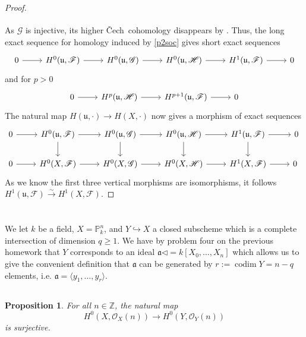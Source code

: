 \documentclass[english,letter,doublesided]{article}
\newcommand{\tosm}{\xrightarrow{\sim}}
\newcommand{\Ff}{\mathscr{F}}
\newcommand{\Hh}{\mathscr{H}}
\newcommand{\ZZ}{\mathbb{Z}}
\newcommand{\OO}{\mathcal{O}}
\newcommand{\Gg}{\mathscr{G}}
\newcommand{\PP}{\mathbb{P}}
\newcommand{\afr}{\mathfrak{a}}
\newcommand{\ufr}{\mathfrak{u}}
\newcommand{\prob}[1]{\setcounter{section}{#1-1}\section{}}
\newcommand{\prt}[1]{\setcounter{subsection}{#1-1}\subsection{}}
\newtheorem*{prop*}{Proposition}
\theoremstyle{remark}
\theoremstyle{definition}
\newcommand{\idl}[1]{\langle #1 \rangle}
\DeclareMathOperator{\codim}{codim}
\newcommand{\cech}{\v Cech~}
\begin{document}
\begin{proof}
\begin{equation}
\begin{tikzcd}
	\end{tikzcd}
	\end{equation}
As $\Gg$ is injective, its higher \cech cohomology disappears by \cite[III.2.4-5]{HSAG}. Thus, the long exact sequence for homology induced by \eqref{p2soc} gives short exact sequences \begin{equation}\begin{tikzcd}0\arrow[r]& H^0(\ufr,\Ff)\arrow[r]&H^0(\ufr,\Gg)\arrow[r]&H^0(\ufr,\Hh)\arrow[r]&H^1(\ufr,\Ff)\arrow[r]&0\end{tikzcd}\end{equation}
and for $p>0$
\begin{equation}\begin{tikzcd}0\arrow[r]&H^p(\ufr,\Hh)\arrow[r]&H^{p+1}(\ufr,\Ff)\arrow[r]&0\end{tikzcd}\end{equation}
The natural map $H(\ufr,\cdot)\to H(X,\cdot)$ now gives a morphism of exact sequences
\begin{equation}\begin{tikzcd}0\arrow[r]& H^0(\ufr,\Ff)\arrow[r]\arrow[d]&H^0(\ufr,\Gg)\arrow[r]\arrow[d]&H^0(\ufr,\Hh)\arrow[r]\arrow[d]&H^1(\ufr,\Ff)\arrow[r]\arrow[d]&0\\
0\arrow[r]& H^0(X,\Ff)\arrow[r]&H^0(X,\Gg)\arrow[r]&H^0(X,\Hh)\arrow[r]&H^1(X,\Ff)\arrow[r]&0\
\end{tikzcd}\end{equation}
As we know the first three vertical morphisms are isomorphisms, it follows $H^1(\ufr,\Ff)\tosm H^1(X,\Ff)$.
\end{proof}
\prob{6}
We let $k$ be a field, $X=\PP^n_k$, and $Y\hookrightarrow X$ a closed subscheme which is a complete intersection of dimension $q\geq 1$. We have by problem four on the previous homework that $Y$ corresponds to an ideal $\afr\triangleleft = k[X_0,\dots,X_n]$ which allows us to give the convenient definition that $\afr$ can be generated by $r:=\codim Y=n-q$ elements, i.e. $\afr=\idl{y_1,\dots,y_r}$.
\prt{1}
\begin{prop*}
	For all $n\in \ZZ$, the natural map $$H^0(X,\OO_X(n))\to H^0(Y,\OO_Y(n))$$ is surjective.
\end{prop*}
\end{document}
